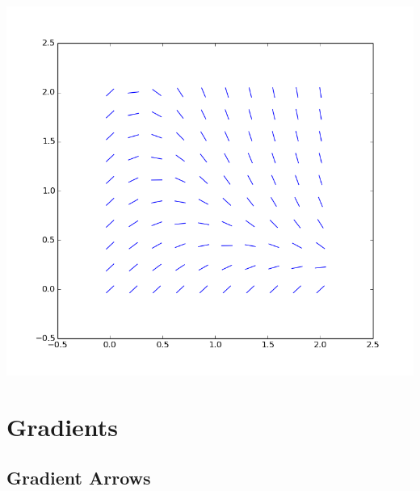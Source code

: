 \documentclass[a4paper,12px]{article}
\begin{document}
\vspace{2cm}
\begin{center}
    \includegraphics[width=(\textwidth/6*5)]{slopefield}
\end{center}
\clearpage

\tableofcontents
\vspace{5mm}

\captionsetup{width=\textwidth/7*5}


\section{Gradients}
\subsection{Gradient Arrows}
\end{document}
